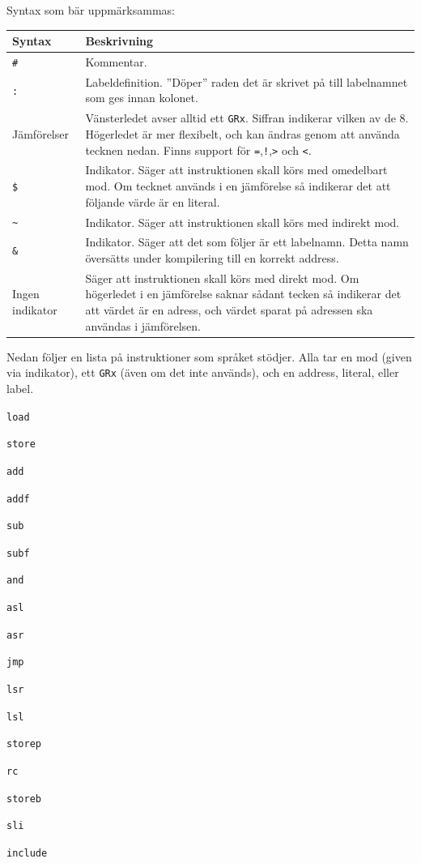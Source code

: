 \documentclass[]{article}
\begin{document}
\noindent
Syntax som bär uppmärksammas:\\

\begin{tabular}{p{2.5cm} p{8.5cm}}
\textbf{Syntax} & \textbf{Beskrivning}\\
\hline
\texttt{\#} & Kommentar.\\
\texttt{:} & Labeldefinition. ''Döper'' raden det är skrivet på till labelnamnet som ges innan kolonet.\\
Jämförelser & Vänsterledet avser alltid ett \texttt{GRx}. Siffran indikerar vilken av de 8. Högerledet är mer flexibelt, och kan ändras genom att använda tecknen nedan. Finns support för \texttt{=},\texttt{!},\texttt{>} och \texttt{<}.\\
\texttt{\$} & Indikator. Säger att instruktionen skall körs med omedelbart mod. Om tecknet används i en jämförelse så indikerar det att följande värde är en literal.\\
\texttt{\~{ }}  & Indikator. Säger att instruktionen skall körs med indirekt mod.\\
\texttt{\&} & Indikator. Säger att det som följer är ett labelnamn. Detta namn översätts under kompilering till en korrekt address.\\
Ingen indikator & Säger att instruktionen skall körs med direkt mod. Om högerledet i en jämförelse saknar sådant tecken så indikerar det att värdet är en adress, och värdet sparat på adressen ska användas i jämförelsen.\\
\end{tabular}

\noindent
Nedan följer en lista på instruktioner som språket stödjer. Alla tar en mod (given via indikator), ett \texttt{GRx} (även om det inte används), och en address, literal, eller label.

\begin{multicols}{3}
\begin{itemize*}
\item \texttt{load}
\item \texttt{store}
\item \texttt{add}
\item \texttt{addf}
\item \texttt{sub}
\item \texttt{subf}
\item \texttt{and}
\item \texttt{asl}
\item \texttt{asr}
\item \texttt{jmp}
\item \texttt{lsr}
\item \texttt{lsl}
\item \texttt{storep}
\item \texttt{rc}
\item \texttt{storeb}
\item \texttt{sli}
\item \texttt{include}
\end{itemize*}
\end{multicols}
\end{document}
